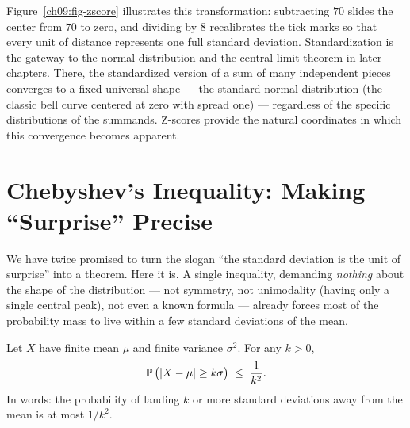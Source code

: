 Figure~\ref{ch09:fig-zscore} illustrates this transformation: subtracting
$70$ slides the center from $70$ to zero, and dividing by $8$ recalibrates
the tick marks so that every unit of distance represents one full standard deviation.
Standardization is the gateway to the normal
distribution and the central limit theorem in later chapters. There, the
standardized version of a sum of many independent pieces converges to a fixed
universal shape --- the standard normal distribution (the classic bell curve centered at zero with spread one) --- regardless of the specific distributions
of the summands. Z-scores provide the natural coordinates in which this convergence
becomes apparent.

\section{Chebyshev's Inequality: Making ``Surprise'' Precise}
\label{ch09:chebyshev}

We have twice promised to turn the slogan ``the standard deviation is the unit
of surprise'' into a theorem. Here it is. A single
inequality, demanding \emph{nothing} about the shape of the distribution ---
not symmetry, not unimodality (having only a single central peak), not even a
known formula --- already forces most of the probability mass to live within a
few standard deviations of the mean.

\begin{theorem}
\label{ch09:thm-cheby}
Let $X$ have finite mean $\mu$ and finite variance $\sigma^2$. For any
$k > 0$,
\[
  \operatorname{\mathbb{P}}\big(\lvert X-\mu\rvert \ge k\sigma\big) \;\le\; \frac{1}{k^2}.
\]
In words: the probability of landing $k$ or more standard deviations away from
the mean is at most $1/k^2$.
\end{theorem}

